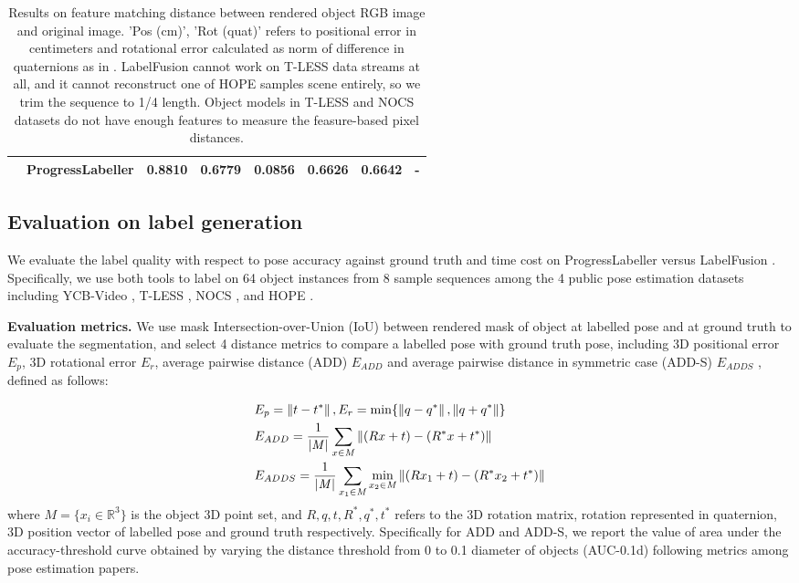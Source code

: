 \begin{table*}[htbp]
\begin{tabular}{@{}p{2cm}p{2.2cm}p{1cm}p{1cm}p{1.2cm}p{1.8cm}p{1.8cm}p{1.4cm}@{}}
      & ProgressLabeller      & 0.8810 & 0.6779 & 0.0856 & 0.6626 & 0.6642 & -\\%
     \bottomrule
   \end{tabular}
   \caption{Results on feature matching distance between rendered object RGB image and original image. 'Pos (cm)', 'Rot (quat)' refers to positional error in centimeters and rotational error calculated as norm of difference in quaternions as in \cite{huynh2009metrics}. LabelFusion cannot work on T-LESS data streams at all, and it cannot reconstruct one of HOPE samples scene entirely, so we trim the sequence to 1/4 length. Object models in T-LESS and NOCS datasets do not have enough features to measure the feasure-based pixel distances.}
   \label{tab:example}
 \end{table*}

\subsection{Evaluation on label generation}
We evaluate the label quality with respect to pose accuracy against ground truth and time cost on ProgressLabeller versus LabelFusion \cite{marion2018label}. Specifically, we use both tools to label on 64 object instances from 8 sample sequences among the 4 public pose estimation datasets including YCB-Video \cite{xiang2017posecnn}, T-LESS \cite{hodan2017tless}, NOCS \cite{li2020category}, and HOPE \cite{hope_github}.%

\noindent
\textbf{Evaluation metrics.} We use mask Intersection-over-Union (IoU) between rendered mask of object at labelled pose and at ground truth to evaluate the segmentation, and select 4 distance metrics to compare a labelled pose with ground truth pose, including 3D positional error $E_p$, 3D rotational error $E_r$, average pairwise distance (ADD) $E_{ADD}$ \cite{hinterstoisser2012model} and average pairwise distance in symmetric case (ADD-S) $E_{ADDS}$ \cite{xiang2017posecnn}, defined as follows:

\begin{align}
    &E_p = \left\lVert t-t^*\right\rVert, E_r = \min \{\left\lVert q - q^*\right\rVert, \left\lVert q + q^*\right\rVert \}\\
    &E_{ADD} = \dfrac{1}{|\mathit{M}|} \sum_{x \in \mathit{M}} \left\lVert(Rx + t) - (R^* x + t^*)\right\rVert\\
    &E_{ADDS} = \dfrac{1}{|\mathit{M}|} \sum_{x_1 \in \mathit{M}} \min_{x_2 \in \mathit{M}}\left\lVert(Rx_1 + t) - (R^* x_2 + t^*)\right\rVert
\end{align}
where $\mathit{M} = \{x_i \in \mathbb{R}^3\}$ is the object 3D point set, and $R, q, t, R^*, q^*, t^*$ refers to the 3D rotation matrix, rotation represented in quaternion, 3D position vector of labelled pose and ground truth respectively. Specifically for ADD and ADD-S, we report the value of area under the accuracy-threshold curve obtained by varying the distance threshold from 0 to 0.1 diameter of objects (AUC-0.1d) following metrics among pose estimation papers.


